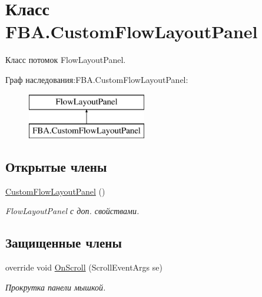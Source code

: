 \hypertarget{class_f_b_a_1_1_custom_flow_layout_panel}{}\section{Класс F\+B\+A.\+Custom\+Flow\+Layout\+Panel}
\label{class_f_b_a_1_1_custom_flow_layout_panel}


Класс потомок Flow\+Layout\+Panel.  


Граф наследования\+:F\+B\+A.\+Custom\+Flow\+Layout\+Panel\+:\begin{figure}[H]
\begin{center}
\leavevmode
\includegraphics[height=2.000000cm]{class_f_b_a_1_1_custom_flow_layout_panel}
\end{center}
\end{figure}
\subsection*{Открытые члены}
\begin{DoxyCompactItemize}
\item 
\mbox{\hyperlink{class_f_b_a_1_1_custom_flow_layout_panel_a3bd23c3f6237edd4ab450ef8ca18536c}{Custom\+Flow\+Layout\+Panel}} ()
\begin{DoxyCompactList}\small\item\em Flow\+Layout\+Panel с доп. свойствами. \end{DoxyCompactList}\end{DoxyCompactItemize}
\subsection*{Защищенные члены}
\begin{DoxyCompactItemize}
\item 
override void \mbox{\hyperlink{class_f_b_a_1_1_custom_flow_layout_panel_a9580ad8acc0d06a1749d7dfa32ca013c}{On\+Scroll}} (Scroll\+Event\+Args se)
\begin{DoxyCompactList}\small\item\em Прокрутка панели мышкой. \end{DoxyCompactList}\end{DoxyCompactItemize}
